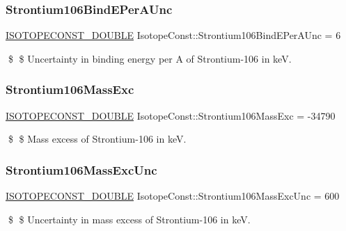 \subsubsection{\texorpdfstring{Strontium106\+Bind\+E\+Per\+A\+Unc}{Strontium106BindEPerAUnc}}
{\footnotesize\ttfamily \mbox{\hyperlink{group___isotope_const-_macros_ga8f45a7272ce02c0b4c65c44636ed719a}{I\+S\+O\+T\+O\+P\+E\+C\+O\+N\+S\+T\+\_\+\+D\+O\+U\+B\+LE}} Isotope\+Const\+::\+Strontium106\+Bind\+E\+Per\+A\+Unc = 6}

\$ \$ Uncertainty in binding energy per A of Strontium-\/106 in keV. \mbox{\label{group___isotope_const-_strontium-_sr106_ga124ab6e98ea87ef97f4c45e2865b1389}} 
\subsubsection{\texorpdfstring{Strontium106\+Mass\+Exc}{Strontium106MassExc}}
{\footnotesize\ttfamily \mbox{\hyperlink{group___isotope_const-_macros_ga8f45a7272ce02c0b4c65c44636ed719a}{I\+S\+O\+T\+O\+P\+E\+C\+O\+N\+S\+T\+\_\+\+D\+O\+U\+B\+LE}} Isotope\+Const\+::\+Strontium106\+Mass\+Exc = -\/34790}

\$ \$ Mass excess of Strontium-\/106 in keV. \mbox{\label{group___isotope_const-_strontium-_sr106_gab2aaa159da49bfb3dd92f298d2256ab8}} 
\subsubsection{\texorpdfstring{Strontium106\+Mass\+Exc\+Unc}{Strontium106MassExcUnc}}
{\footnotesize\ttfamily \mbox{\hyperlink{group___isotope_const-_macros_ga8f45a7272ce02c0b4c65c44636ed719a}{I\+S\+O\+T\+O\+P\+E\+C\+O\+N\+S\+T\+\_\+\+D\+O\+U\+B\+LE}} Isotope\+Const\+::\+Strontium106\+Mass\+Exc\+Unc = 600}

\$ \$ Uncertainty in mass excess of Strontium-\/106 in keV. \mbox{\label{group___isotope_const-_strontium-_sr106_ga9f0dbbc81a04f750b29254d8193f21c0}} 

